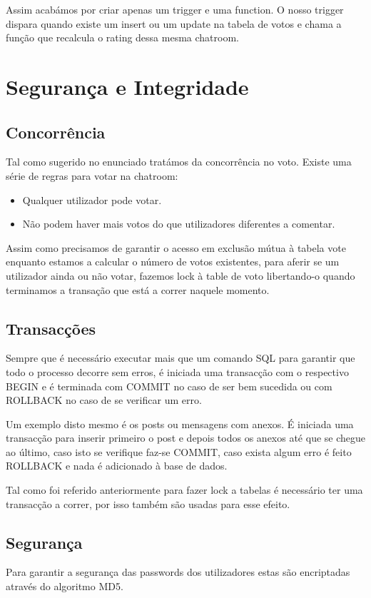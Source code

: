 \documentclass[a4paper, 12pt]{article}
\begin{document}
Assim acabámos por criar apenas um trigger e uma function. O nosso trigger dispara quando existe um insert ou um update na tabela de votos e chama a função que recalcula o rating dessa mesma chatroom.
\cleardoublepage


\section{Segurança e Integridade}
\subsection{Concorrência}
\indent \indent Tal como sugerido no enunciado tratámos da concorrência no voto. Existe uma série de regras para votar na chatroom:
\begin{itemize}
	\item Qualquer utilizador pode votar.
	\item Não podem haver mais votos do que utilizadores diferentes a comentar.
\end{itemize}

Assim como precisamos de garantir o acesso em exclusão mútua à tabela vote enquanto estamos a calcular o número de votos existentes, para aferir se um utilizador ainda ou não votar, fazemos lock à table de voto libertando-o quando terminamos a transação que está a correr naquele momento.

\subsection{Transacções}
\indent \indent Sempre que é necessário executar mais que um comando SQL para garantir que todo o processo decorre sem erros, é iniciada uma transacção com o respectivo BEGIN e é terminada com COMMIT no caso de ser bem sucedida ou com ROLLBACK no caso de se verificar um erro.

Um exemplo disto mesmo é os posts ou mensagens com anexos. É iniciada uma transacção para inserir primeiro o post e depois todos os anexos até que se chegue ao último, caso isto se verifique faz-se COMMIT, caso exista algum erro é feito ROLLBACK e nada é adicionado à base de dados.

Tal como foi referido anteriormente para fazer lock a tabelas é necessário ter uma transacção a correr, por isso também são usadas para esse efeito.
\cleardoublepage

\subsection{Segurança}
\indent \indent Para garantir a segurança das passwords dos utilizadores estas são encriptadas através do algoritmo MD5.
\end{document}
